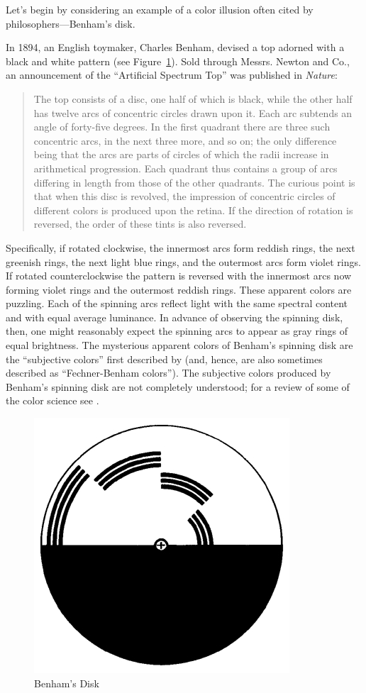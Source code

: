 \documentclass[12pt]{article}
\begin{document}
Let's begin by considering an example of a color illusion often cited by philosophers---Benham's disk.

In 1894, an English toymaker, Charles Benham, devised a top adorned with a black and white pattern (see Figure~\ref{fig:benham}). Sold through Messrs. Newton and Co., an announcement of the ``Artificial Spectrum Top'' was published in \emph{Nature}:
\begin{quote}
	The top consists of a disc, one half of which is black, while the other half has twelve arcs of concentric circles drawn upon it. Each arc subtends an angle of forty-five degrees. In the first quadrant there are three such concentric arcs, in the next three more, and so on; the only difference being that the arcs are parts of circles of which the radii increase in arithmetical progression. Each quadrant thus contains a group of arcs differing in length from those of the other quadrants. The curious point is that when this disc is revolved, the impression of concentric circles of different colors is produced upon the retina. If the direction of rotation is reversed, the order of these tints is also reversed. \citep{Benham:1894kx}
\end{quote}
Specifically, if rotated clockwise, the innermost arcs form reddish rings, the next greenish rings, the next light blue rings, and the outermost arcs form violet rings. If rotated counterclockwise the pattern is reversed with the innermost arcs now forming violet rings and the outermost reddish rings. These apparent colors are puzzling. Each of the spinning arcs reflect light with the same spectral content and with equal average luminance. In advance of observing the spinning disk, then, one might reasonably expect the spinning arcs to appear as gray rings of equal brightness. The mysterious apparent colors of Benham's spinning disk are the ``subjective colors'' first described by \citep{Fechner:1838vn} (and, hence, are also sometimes described as ``Fechner-Benham colors''). The subjective colors produced by Benham's spinning disk are not completely understood; for a review of some of the color science see \citet{Campenhausen:1995yq}.

\begin{figure}[htbp]
	\centering
		\includegraphics[scale=.5]{graphics/benhams_disk.jpg}
	\caption{Benham's Disk}
	\label{fig:benham}
\end{figure}
\end{document}
